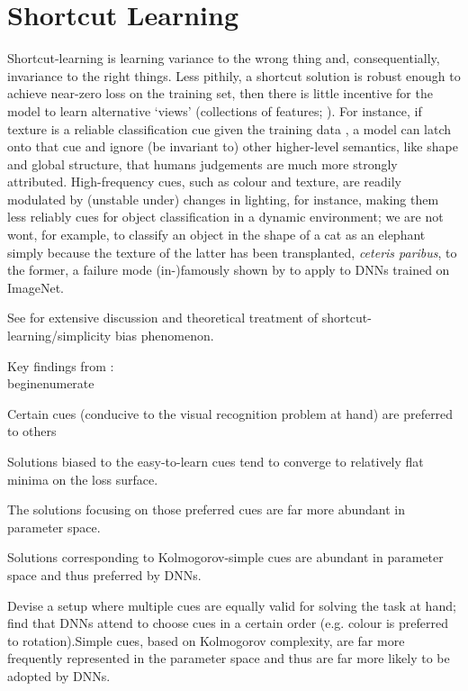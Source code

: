 \section{Shortcut Learning}\label{shortcut-learning}

Shortcut-learning is learning variance to the wrong thing and, consequentially, invariance to the
right things.
%
Less pithily, a shortcut solution is robust enough to achieve near-zero loss on the training set,
then there is little incentive for the model to learn alternative `views' (collections of features;
\cite{allen2020towards}).
%
For instance, if texture is a reliable classification cue given the training data
\cite{geirhos2018imagenet}, a model can latch onto that cue and ignore (be invariant to) other
higher-level semantics, like shape and global structure, that humans judgements are much more
strongly attributed.
%
High-frequency cues, such as colour and texture, are readily modulated by (unstable under) changes
in lighting, for instance, making them less reliably cues for object classification in a dynamic
environment; we are not wont, for example, to classify an object in the shape of a cat as an
elephant simply because the texture of the latter has been transplanted, \emph{ceteris paribus}, to
the former, a failure mode (in-)famously shown by \cite{geirhos2018imagenet} to apply to DNNs
trained on ImageNet.

See \cite{valle2018deep, geirhos2020shortcut, scimeca2021shortcut, shah2020pitfalls} for extensive discussion and
theoretical treatment of shortcut-learning/simplicity bias phenomenon.

Key findings from \cite{scimeca2021shortcut}:
\\begin{enumerate}
         \item Certain cues (conducive to the visual recognition problem at hand) are preferred to
           others
         \item Solutions biased to the easy-to-learn cues tend to converge to relatively flat minima
           on the loss surface.
         \item The solutions focusing on those preferred cues are far more abundant in parameter
           space.
         \item Solutions corresponding to Kolmogorov-simple cues are abundant in parameter space
           and thus preferred by DNNs.
          \item Devise a setup where multiple cues are equally valid for solving the task at hand;
            find that DNNs attend to choose cues in a certain order (e.g. colour is preferred to
            rotation).Simple cues, based on Kolmogorov complexity, are far more frequently
            represented in the parameter space and thus are far more likely to be adopted by DNNs.
          
